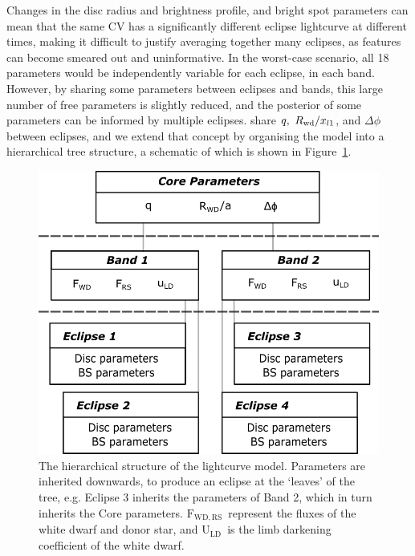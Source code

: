 Changes in the disc radius and brightness profile, and bright spot parameters can mean that the same CV has a significantly different eclipse lightcurve at different times, making it difficult to justify averaging together many eclipses, as features can become smeared out and uninformative. In the worst-case scenario, all 18 parameters would be independently variable for each eclipse, in each band. However, by sharing some parameters between eclipses and bands, this large number of free parameters is slightly reduced, and the posterior of some parameters can be informed by multiple eclipses. \citet{McAllister2017} share $q,\ R_{\rm wd} / x_{l1}$, and $\Delta\phi$ between eclipses, and we extend that concept by organising the model into a hierarchical tree structure, a schematic of which is shown in Figure~\ref{fig:method:hierarchical_model}. 

\begin{figure}
    \centering
    \includegraphics[width=.85\columnwidth ]{figures/three_cvs_with_weird_colours/GeneralFigs/hierarchical_model_structure.png}
    \caption{The hierarchical structure of the lightcurve model. Parameters are inherited downwards, to produce an eclipse at the `leaves' of the tree, e.g. Eclipse 3 inherits the parameters of Band 2, which in turn inherits the Core parameters. $\mathrm{F_{WD, RS}}$\ represent the fluxes of the white dwarf and donor star, and $\mathrm{U_{LD}}$\ is the limb darkening coefficient of the white dwarf.}
    \label{fig:method:hierarchical_model}
\end{figure}

